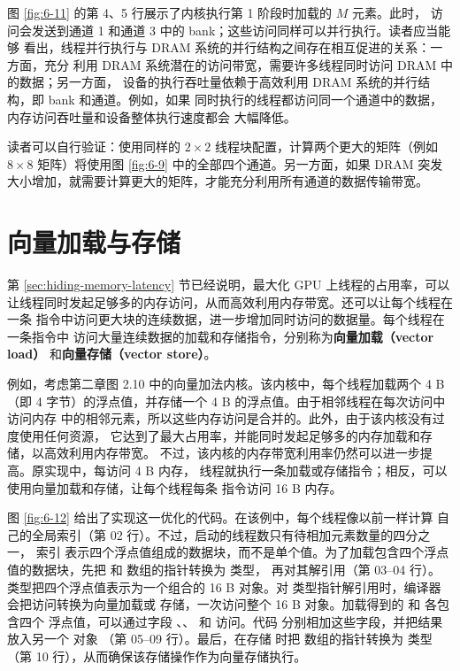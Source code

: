 图 \ref{fig:6-11} 的第 4、5 行展示了内核执行第 1 阶段时加载的 $M$ 元素。此时，
访问会发送到通道 1 和通道 3 中的 bank；这些访问同样可以并行执行。读者应当能够
看出，线程并行执行与 DRAM 系统的并行结构之间存在相互促进的关系：一方面，充分
利用 DRAM 系统潜在的访问带宽，需要许多线程同时访问 DRAM 中的数据；另一方面，
设备的执行吞吐量依赖于高效利用 DRAM 系统的并行结构，即 bank 和通道。例如，如果
同时执行的线程都访问同一个通道中的数据，内存访问吞吐量和设备整体执行速度都会
大幅降低。

读者可以自行验证：使用同样的 $2\times2$ 线程块配置，计算两个更大的矩阵（例如
$8\times8$ 矩阵）将使用图 \ref{fig:6-9} 中的全部四个通道。另一方面，如果 DRAM
突发大小增加，就需要计算更大的矩阵，才能充分利用所有通道的数据传输带宽。

\section{向量加载与存储}
\label{sec:vector-loads-stores}

第 \ref{sec:hiding-memory-latency} 节已经说明，最大化 GPU 上线程的占用率，可以
让线程同时发起足够多的内存访问，从而高效利用内存带宽。还可以让每个线程在一条
指令中访问更大块的连续数据，进一步增加同时访问的数据量。每个线程在一条指令中
访问大量连续数据的加载和存储指令，分别称为\textbf{向量加载（vector load）}
和\textbf{向量存储（vector store）}。

例如，考虑第二章图 2.10 中的向量加法内核。该内核中，每个线程加载两个 4 B（即
4 字节）的浮点值，并存储一个 4 B 的浮点值。由于相邻线程在每次访问中访问内存
中的相邻元素，所以这些内存访问是合并的。此外，由于该内核没有过度使用任何资源，
它达到了最大占用率，并能同时发起足够多的内存加载和存储，以高效利用内存带宽。
不过，该内核的内存带宽利用率仍然可以进一步提高。原实现中，每访问 4 B 内存，
线程就执行一条加载或存储指令；相反，可以使用向量加载和存储，让每个线程每条
指令访问 16 B 内存。

图 \ref{fig:6-12} 给出了实现这一优化的代码。在该例中，每个线程像以前一样计算
自己的全局索引（第 02 行）。不过，启动的线程数只有待相加元素数量的四分之一，
索引  表示四个浮点值组成的数据块，而不是单个值。为了加载包含四个浮点
值的数据块，先把  和  数组的指针转换为  类型，
再对其解引用（第 03--04 行）。 类型把四个浮点值表示为一个组合的
16 B 对象。对  类型指针解引用时，编译器会把访问转换为向量加载或
存储，一次访问整个 16 B 对象。加载得到的  和  各包含四个
浮点值，可以通过字段 、、 和  访问。代码
分别相加这些字段，并把结果放入另一个  对象 （第 05--09
行）。最后，在存储  时把  数组的指针转换为  类型
（第 10 行），从而确保该存储操作作为向量存储执行。

